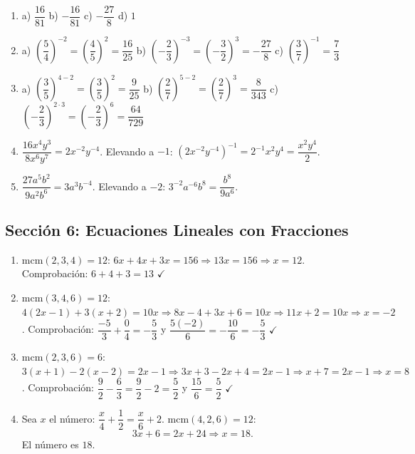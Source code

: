 \documentclass[12pt, letterpaper]{article}
\begin{document}
  \begin{enumerate}[leftmargin=*, label=\textbf{\arabic*.}]
    \item a) $\dfrac{16}{81}$ \quad b) $-\dfrac{16}{81}$ \quad c) $-\dfrac{27}{8}$ \quad d) $1$

    \item a) $\left(\dfrac{5}{4}\right)^{-2} = \left(\dfrac{4}{5}\right)^2 = \dfrac{16}{25}$ \quad
          b) $\left(-\dfrac{2}{3}\right)^{-3} = \left(-\dfrac{3}{2}\right)^3 = -\dfrac{27}{8}$ \quad
          c) $\left(\dfrac{3}{7}\right)^{-1} = \dfrac{7}{3}$

    \item a) $\left(\dfrac{3}{5}\right)^{4-2} = \left(\dfrac{3}{5}\right)^2 = \dfrac{9}{25}$ \quad
          b) $\left(\dfrac{2}{7}\right)^{5-2} = \left(\dfrac{2}{7}\right)^3 = \dfrac{8}{343}$ \quad
          c) $\left(-\dfrac{2}{3}\right)^{2 \cdot 3} = \left(-\dfrac{2}{3}\right)^6 = \dfrac{64}{729}$

    \item $\dfrac{16x^4y^3}{8x^6y^7} = 2x^{-2}y^{-4}$. Elevando a $-1$: $\left(2x^{-2}y^{-4}\right)^{-1} = 2^{-1}x^{2}y^{4} = \dfrac{x^2y^4}{2}$.

    \item $\dfrac{27a^5b^2}{9a^2b^6} = 3a^{3}b^{-4}$. Elevando a $-2$: $3^{-2}a^{-6}b^{8} = \dfrac{b^8}{9a^6}$.
  \end{enumerate}

  \newpage

  \subsection*{Sección 6: Ecuaciones Lineales con Fracciones}

  \begin{enumerate}[leftmargin=*, label=\textbf{\arabic*.}]
    \item mcm$(2,3,4) = 12$: $6x + 4x + 3x = 156 \Rightarrow 13x = 156 \Rightarrow x = 12$.
          Comprobación: $6 + 4 + 3 = 13$ $\checkmark$

    \item mcm$(3,4,6) = 12$: $4(2x - 1) + 3(x + 2) = 10x \Rightarrow 8x - 4 + 3x + 6 = 10x \Rightarrow 11x + 2 = 10x \Rightarrow x = -2$.
          Comprobación: $\dfrac{-5}{3} + \dfrac{0}{4} = -\dfrac{5}{3}$ y $\dfrac{5(-2)}{6} = -\dfrac{10}{6} = -\dfrac{5}{3}$ $\checkmark$

    \item mcm$(2,3,6) = 6$: $3(x + 1) - 2(x - 2) = 2x - 1 \Rightarrow 3x + 3 - 2x + 4 = 2x - 1 \Rightarrow x + 7 = 2x - 1 \Rightarrow x = 8$.
          Comprobación: $\dfrac{9}{2} - \dfrac{6}{3} = \dfrac{9}{2} - 2 = \dfrac{5}{2}$ y $\dfrac{15}{6} = \dfrac{5}{2}$ $\checkmark$

    \item Sea $x$ el número: $\dfrac{x}{4} + \dfrac{1}{2} = \dfrac{x}{6} + 2$. mcm$(4,2,6) = 12$:
          $$3x + 6 = 2x + 24 \Rightarrow x = 18.$$
          El número es $18$.
  \end{enumerate}

\fi
\end{document}
